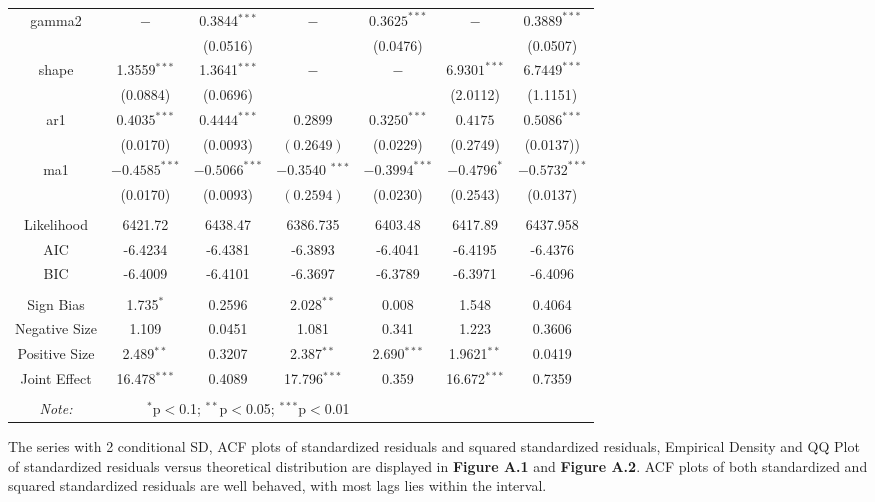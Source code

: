 \documentclass[a4paper]{article}
\begin{document}
\begin{table}[H]
\begin{tabular}{@{\extracolsep{5pt}} ccccccc}
gamma2 & $-$ & 0.3844$^{***}$& $-$ & $0.3625^{***}$ & $-$ & $0.3889^{***}$  \\ 
& & (0.0516) & & (0.0476)& & (0.0507)\\[1.8ex]

shape & 1.3559$^{***}$ & 1.3641$^{***}$& $-$ & $-$ & $6.9301^{***}$ & $6.7449^{***}$  \\ 
& (0.0884) & (0.0696) & & & (2.0112) & (1.1151)\\[1.8ex]

ar1 & $0.4035^{***}$ & $0.4444^{***}$ & $0.2899$ & $0.3250^{***}$ & $0.4175$ & $0.5086^{***}$ \\ 
& (0.0170) & (0.0093) & $(0.2649)$ & (0.0229) & (0.2749) & (0.0137))\\[1.8ex]

ma1 & $-0.4585^{***}$ & $-0.5066^{***}$ & $-0.3540$ $^{***}$ & $-0.3994^{***}$ & $-0.4796^{*}$ & $-0.5732^{***}$  \\ 
& (0.0170) & (0.0093) & $(0.2594)$ & (0.0230) & (0.2543) & (0.0137)\\[1.8ex]

\hline \\[-1.8ex] 
Likelihood & 6421.72 & 6438.47 & 6386.735 & 6403.48 & 6417.89& 6437.958\\ 
AIC & -6.4234 & -6.4381 & -6.3893 & -6.4041 & -6.4195 &-6.4376\\
BIC & -6.4009 & -6.4101 & -6.3697 & -6.3789 & -6.3971 & -6.4096\\
\hline \\[-1.8ex] 
Sign Bias & 1.735$^{*}$ & 0.2596 & 2.028$^{**}$ & 0.008 & 1.548 & 0.4064\\
Negative Size & 1.109 & 0.0451 & 1.081 & 0.341 & 1.223 & 0.3606\\
Positive Size & 2.489$^{**}$ & 0.3207 & 2.387$^{**}$ & 2.690$^{***}$ & 1.9621$^{**}$ & 0.0419\\
Joint Effect & 16.478$^{***}$ & 0.4089 & 17.796$^{***}$ & 0.359 & 16.672$^{***}$& 0.7359\\
\hline \\[-1.8ex] 
\textit{Note:}  & \multicolumn{3}{r}{$^{*}$p$<$0.1; $^{**}$p$<$0.05; $^{***}$p$<$0.01} \\ 
\end{tabular} 
\end{table} 

The series with 2 conditional SD, ACF plots of standardized residuals and squared standardized residuals, Empirical Density and QQ Plot of standardized residuals versus theoretical distribution are displayed in \textbf{Figure A.1} and \textbf{Figure A.2}. ACF plots of both standardized and squared standardized residuals are well behaved, with most lags lies within the interval.\\
\end{document}
